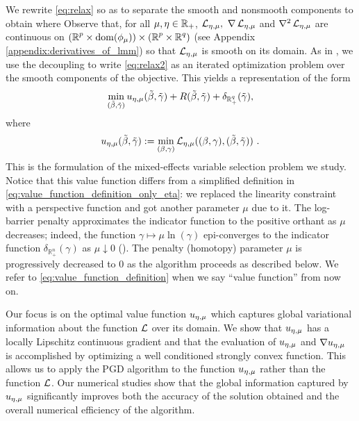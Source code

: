 We rewrite \eqref{eq:relax} %
so as to separate the smooth and nonsmooth components to obtain
where 
Observe that, for all $\mu,\eta\in\operatorname{\mathbb{R}}_+$, $\operatorname{\mathcal{L}}_{{\eta,\mu}},\ \nabla \operatorname{\mathcal{L}}_{{\eta,\mu}}$ and $\nabla^2 \operatorname{\mathcal{L}}_{{\eta,\mu}}$ are continuous
on $({\operatorname{\mathbb{R}}^p}\times\operatorname{\mathrm{dom}}(\phi_\mu))\times({\operatorname{\mathbb{R}}^p}\times{\operatorname{\mathbb{R}}^q})$ 
(see Appendix \ref{appendix:derivatives_of_lmm}) 
so that $\operatorname{\mathcal{L}}_{{\eta,\mu}}$ is smooth on its domain.
As in \cite{Zheng2019SR3}, we use the 
decoupling to write \eqref{eq:relax2}
as an iterated optimization problem over the smooth components of the objective.
This yields a representation of the form
\begin{equation}
    \label{eq:relax3}
    \min_{(\tilde\beta,{\tilde{\gamma}})} {u_{\eta,\mu}}(\tilde\beta,{\tilde{\gamma}}) + R(\tilde\beta,{\tilde{\gamma}})+\delta_{\operatorname{\mathbb{R}}^q_+}({\tilde{\gamma}}),
\end{equation}
where %
\begin{equation}
    \label{eq:value_function_definition}
    {u_{\eta,\mu}}(\tilde\beta,{\tilde{\gamma}}) := \min_{(\beta,\gamma) } 
    \operatorname{\mathcal{L}}_{{\eta,\mu}}((\beta,\gamma), (\tilde\beta,{\tilde{\gamma}}))\ .
\end{equation}
This is the formulation of the mixed-effects variable selection problem we study. 
Notice that this value function differs from a simplified 
definition in \eqref{eq:value_function_definition_only_eta}: we replaced 
the linearity constraint with a perspective function and got another parameter $\mu$ due to it. The log-barrier penalty approximates the indicator function to the positive orthant as $\mu$ decreases; indeed, the function $\gamma\mapsto\mu\ln(\gamma)$ epi-converges to the indicator function $\delta_{\mathbb{R}^n_+}(\gamma)$ as $\mu \downarrow 0$ (\cite{rockafellar2009variational}). The penalty (homotopy) parameter $\mu$ is progressively decreased to $0$ as the algorithm proceeds as described below. 
 We refer to \eqref{eq:value_function_definition} when we say ``value function'' from now on.

Our focus is on the optimal value function ${u_{\eta,\mu}}$ which captures global 
variational information about the function $\operatorname{\mathcal{L}}$ over its domain.
We show that ${u_{\eta,\mu}}$ has a locally Lipschitz continuous gradient
and that the evaluation of ${u_{\eta,\mu}}$ and $\nabla {u_{\eta,\mu}}$ is accomplished
by optimizing a well conditioned strongly convex function. This
allows us to apply the PGD algorithm to the function ${u_{\eta,\mu}}$ rather than
the function $\operatorname{\mathcal{L}}$. Our numerical studies show that the global information 
captured by ${u_{\eta,\mu}}$ significantly improves both the accuracy of the solution
obtained and the overall numerical efficiency of the algorithm.


